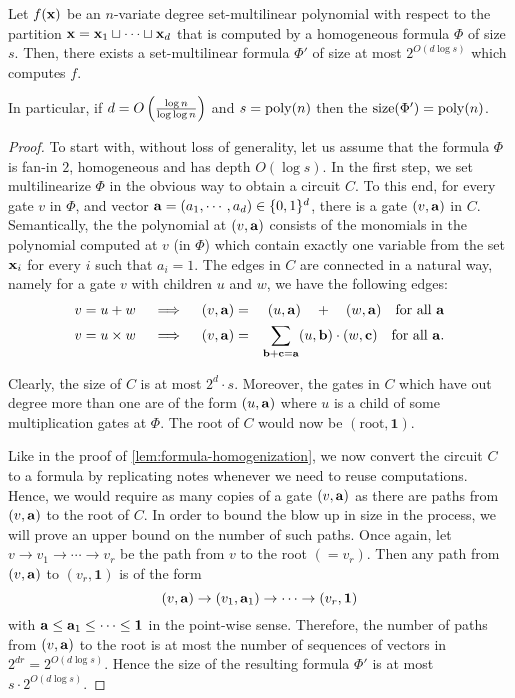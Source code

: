\begin{lemma}\label{lem:formula set-multilinearization}
  Let $f(\mathbf{x})$ be an $n$-variate degree set-multilinear polynomial with respect to the partition $\mathbf{x} = \mathbf{x}_1\sqcup \cdots \sqcup \mathbf{x}_d$ that is computed by a homogeneous formula $\Phi$ of size $s$.
Then, there exists a set-multilinear formula $\Phi'$ of size at most $2^{O(d\log s)}$ which computes $f$.

In particular, if $d = O\left(\frac{\log n}{\log \log n}\right)$ and $s = \operatorname{poly}(n)$ then the $\mathrm{size}(\Phi') = \operatorname{poly}(n)$.  
\end{lemma}
\begin{proof}
To start with, without loss of generality, let us assume that the formula $\Phi$ is fan-in $2$, homogeneous and has depth $O(\log s)$.
In the first step, we set multilinearize $\Phi$ in the obvious way to obtain a circuit $C$.
To this end, for every gate $v$ in $\Phi$, and vector $\mathbf{a} = (a_1,\cdots, a_d) \in \{0,1\}^d$, there is a gate $(v, \mathbf{a})$ in $C$.
Semantically, the the polynomial at $(v,\mathbf{a})$ consists of the monomials in the polynomial computed at $v$ (in $\Phi$) which contain exactly one variable from the set $\mathbf{x}_i$ for every $i$ such that $a_i = 1$.
The edges in $C$ are connected in a natural way, namely for a gate $v$ with children $u$ and $w$, we have the following edges:
\begin{eqnarray*}
\text{$v = u + w$}\quad\implies\quad (v, \mathbf{a}) &=& (u, \mathbf{a}) \quad + \quad (w, \mathbf{a})\quad\text{for all $\mathbf{a}$}\\
\text{$v = u \times w$}\quad\implies\quad (v, \mathbf{a}) &=& \sum_{\mathbf{b} + \mathbf{c} = \mathbf{a}} (u, \mathbf{b})\cdot (w, \mathbf{c}) \quad\text{for all $\mathbf{a}$}.
\end{eqnarray*}
 
Clearly, the size of $C$ is at most $2^d\cdot s$.
Moreover, the gates in $C$ which have out degree more than one are of the form $(u,\mathbf{a})$ where $u$ is a child of some multiplication gates at $\Phi$. 
The root of $C$ would now be $(\text{root},\mathbf{1})$. 

Like in the proof of \autoref{lem:formula-homogenization}, we now convert the circuit $C$ to a formula by replicating notes whenever we need to reuse computations.
Hence, we would require as many copies of a gate $(v, \mathbf{a})$ as there are paths from $(v,\mathbf{a})$ to the root of $C$.
In order to bound the blow up in size in the process, we will prove an upper bound on the number of such paths.
Once again, let $v \rightarrow v_1 \rightarrow \cdots \rightarrow v_r$ be the path from $v$ to the root $(=v_r)$.
Then any path from $(v,\mathbf{a})$ to $(v_r,\mathbf{1})$ is of the form
\[
(v,\mathbf{a}) \rightarrow (v_1,\mathbf{a}_1) \rightarrow \cdots \rightarrow (v_r,\mathbf{1})
\]
with $\mathbf{a} \leq \mathbf{a}_1 \leq \cdots \leq \mathbf{1}$ in the point-wise sense.
Therefore, the number of paths from $(v,\mathbf{a})$ to the root is at most the number of sequences of vectors in $2^{dr} = 2^{O(d\log s)}$.
Hence the size of the resulting formula $\Phi'$ is at most $s \cdot 2^{O(d \log s)}$. 
\end{proof}

